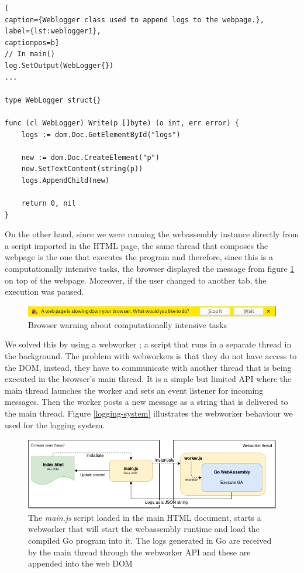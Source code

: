 \begin{lstlisting}[
caption={Weblogger class used to append logs to the webpage.},
label={lst:weblogger1},
captionpos=b]
// In main()
log.SetOutput(WebLogger{})
...

type WebLogger struct{}

func (cl WebLogger) Write(p []byte) (o int, err error) {
	logs := dom.Doc.GetElementById("logs")

	new := dom.Doc.CreateElement("p")
	new.SetTextContent(string(p))
	logs.AppendChild(new)

	return 0, nil
}
\end{lstlisting} 

On the other hand, since we were running the webassembly instance directly from a script imported in the HTML page, the same thread that composes the webpage is the one that executes the program and therefore, since this is a computationally intensive tasks, the browser displayed the message from figure \ref{image:kill-task} on top of the webpage. Moreover, if the user changed to another tab, the execution was paused.

\begin{figure}[h!]
		\centering
    	\includegraphics[width=\linewidth]{assets/images/browser-warning.png}
    	\caption{Browser warning about computationally intensive tasks}
    	\label{image:kill-task}
\end{figure} 

We solved this by using a webworker \cite{webworker}; a script that runs in a separate thread in the background. The problem with webworkers is that they do not have access to the DOM, instead, they have to communicate with another thread that is being executed in the browser's main thread. It is a simple but limited API where the main thread launches the worker and sets an event listener for incoming messages. Then the worker posts a new message as a string that is delivered to the main thread. Figure \ref{logging-system} illustrates the webworker behaviour we used for the logging system.

\begin{figure}[h!]
		\centering
    	\includegraphics[width=\linewidth]{assets/images/logging-system.png}
    	\caption{The \textit{main.js} script loaded in the main HTML document, starts a webworker that will start the webassembly runtime and load the compiled Go program into it. The logs generated in Go are received by the main thread through the webworker API and these are appended into the web DOM}
    	\label{image:logging-system}
\end{figure} 

